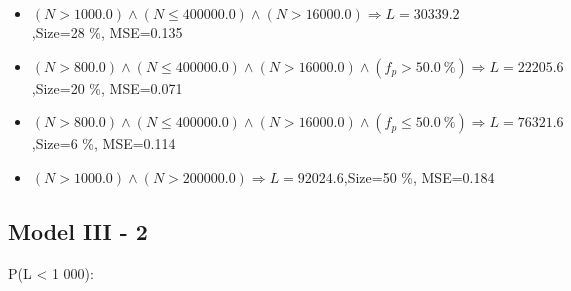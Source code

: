\documentclass[numbered]{CSL}
\begin{document}
\begin{itemize}
\item $(N > 1000.0) \land (N \leq 400000.0) \land (N > 16000.0) \Rightarrow L = 30339.2$,\hfill Size=28 \%, MSE=0.135
\item $(N > 800.0) \land (N \leq 400000.0) \land (N > 16000.0) \land (f_p > 50.0~\%) \Rightarrow L = 22205.6$,\hfill Size=20 \%, MSE=0.071
\item $(N > 800.0) \land (N \leq 400000.0) \land (N > 16000.0) \land (f_p \leq 50.0~\%) \Rightarrow L = 76321.6$,\hfill Size=6 \%, MSE=0.114
\item $(N > 1000.0) \land (N > 200000.0) \Rightarrow L = 92024.6$,\hfill Size=50 \%, MSE=0.184
\end{itemize}

\subsection{Model III - 2}
P(L < 1 000):
\end{document}
